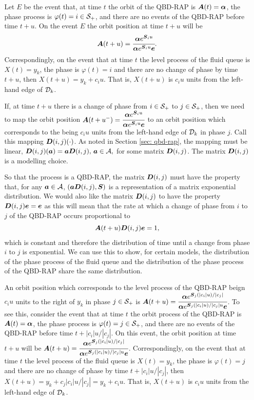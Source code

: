 Let \(E\) be the event that, at time \(t\) the orbit of the QBD-RAP is \(\boldsymbol A(t) = \boldsymbol \alpha\), the phase process is \(\varphi(t) = i\in\mathcal{S}_+\), and there are no events of the QBD-RAP before time \(t+u\). On the event \(E\) the orbit position at time \(t+u\) will be 
\begin{align}
	\boldsymbol A(t+u) = \cfrac{\boldsymbol \alpha e^{\boldsymbol S_i u}}{\boldsymbol \alpha e^{\boldsymbol S_i u}\boldsymbol e}.\label{eqn: orbit i}
\end{align}
Correspondingly, on the event that at time \(t\) the level process of the fluid queue is \(X(t)=y_{k}\), the phase is \(\varphi(t)=i\) and there are no change of phase by time \(t+u\), then \(X(t+u)=y_{k}+c_iu\). That is, \(X(t+u)\) is \(c_iu\) units from the left-hand edge of \(\mathcal{D}_k\). 

If, at time \(t+u\) there is a change of phase from \(i\in\mathcal{S}_+\) to \(j\in\mathcal{S}_+\), then we need to map the orbit position \(\boldsymbol A(t+u^-) = \cfrac{\boldsymbol \alpha e^{\boldsymbol S_i u}}{\boldsymbol \alpha e^{\boldsymbol S_i u}\boldsymbol e}\) to an orbit position which corresponds to the being \(c_iu\) units from the left-hand edge of \(\mathcal{D}_k\) in phase \(j\). Call this mapping \(\boldsymbol D(i,j)(\cdot)\). As noted in Section \ref{sec: qbd-rap}, the mapping must be linear, 
\(\boldsymbol D(i,j)(\boldsymbol a) = \boldsymbol a \boldsymbol D(i,j),\, \boldsymbol a \in\mathcal A,\)
for some matrix \(\boldsymbol D(i,j)\). The matrix \(\boldsymbol D(i,j)\) is a modelling choice. 

So that the process is a QBD-RAP, the matrix \(\boldsymbol D(i,j)\) must have the property that, for any \(\boldsymbol a\in\mathcal A\), \((\boldsymbol a\boldsymbol D(i,j), \boldsymbol S)\) is a representation of a matrix exponential distribution. We would also like the matrix \(\boldsymbol D(i,j)\) to have the property \(\boldsymbol D(i,j) \boldsymbol e = \boldsymbol e\) as this will mean that the rate at which a change of phase from \(i\) to \(j\) of the QBD-RAP occurs proportional to 
\[\boldsymbol A(t+u) \boldsymbol D(i,j)\boldsymbol e = 1,\]
which is constant and therefore the distribution of time until a change from phase \(i\) to \(j\) is exponential. We can use this to show, for certain models, the distribution of the phase process of the fluid queue and the distribution of the phase process of the QBD-RAP share the same distribution.

An orbit position which corresponds to the level process of the QBD-RAP beign \(c_iu\) units to the right of \(y_k\) in phase \(j\in\mathcal{S}_+\) is \(\boldsymbol A(t+u) = \cfrac{\boldsymbol \alpha e^{\boldsymbol S_j (|c_i|u)/|c_j|}}{\boldsymbol \alpha e^{\boldsymbol S_j (|c_i|u)/|c_j| u}\boldsymbol e}\). To see this, consider the event that at time \(t\) the orbit process of the QBD-RAP is \(\boldsymbol A(t) = \boldsymbol \alpha\), the phase process is \(\varphi(t) = j\in\mathcal{S}_+\), and there are no events of the QBD-RAP before time \(t+|c_i|u/|c_j|\). On this event, the orbit position at time \(t+u\) will be \(\displaystyle \boldsymbol A(t+u) = \cfrac{\boldsymbol \alpha e^{\boldsymbol S_j (|c_i|u)/|c_j|}}{\boldsymbol \alpha e^{\boldsymbol S_j (|c_i|u)/|c_j| u}\boldsymbol e}\). Correspondingly, on the event that at time \(t\) the level process of the fluid queue is \(X(t)=y_{k}\), the phase is \(\varphi(t)=j\) and there are no change of phase by time \(t+|c_i|u/|c_j|\), then \(X(t+u)=y_{k}+c_j|c_i|u/|c_j| = y_k+c_iu\). That is, \(X(t+u)\) is \(c_iu\) units from the left-hand edge of \(\mathcal{D}_k\). 

